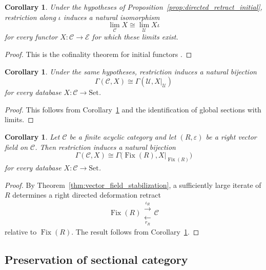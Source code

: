 \documentclass[12pt]{amsart}
\newtheorem{corollary}[teo]{Corollary}
\theoremstyle{definition}
\theoremstyle{remark}
\numberwithin{figure}{section}%
\newcommand{\CC}{\mathcal{C}}
\newcommand{\E}{\mathcal{E}}
\newcommand{\Sets}{\mathrm{Set}}
\newcommand{\Uc}{\mathcal{U}}
\begin{document}
\begin{corollary}\label{cor:directed_retract_limits}
Under the hypotheses of
Proposition~\ref{prop:directed_retract_initial}, restriction along
\(\iota\) induces a natural isomorphism
\[
\lim_\CC X
\cong
\lim_\Uc X\iota
\]
for every functor \(X\colon\CC\to\E\) for which these limits exist.
\end{corollary}

\begin{proof}
This is the cofinality theorem for initial functors \cite[Chapter~IX, Section~3]{MacLaneCategories}.
\end{proof}

\begin{corollary}\label{cor:directed_retract_database_sections}
Under the same hypotheses, restriction induces a natural bijection
\[
\Gamma(\CC,X)
\cong
\Gamma(\Uc,X|_\Uc)
\]
for every database \(X\colon\CC\to\Sets\).
\end{corollary}

\begin{proof}
This follows from
Corollary~\ref{cor:directed_retract_limits} and the identification of
global sections with limits.
\end{proof}

\begin{corollary}\label{cor:vector_field_database_sections}
Let \(\CC\) be a finite acyclic category and let
\((R,\varepsilon)\) be a right vector field on \(\CC\). Then restriction
induces a natural bijection
\[
\Gamma(\CC,X)
\cong
\Gamma\bigl(
\operatorname{Fix}(R),
X|_{\operatorname{Fix}(R)}
\bigr)
\]
for every database \(X\colon\CC\to\Sets\).
\end{corollary}

\begin{proof}
By Theorem~\ref{thm:vector_field_stabilization}, a sufficiently large
iterate of \(R\) determines a right directed deformation retract
\[
\operatorname{Fix}(R)
\mathrel{\substack{\xrightarrow{\iota_R}\\[-1mm]\xleftarrow[r_R]{}}}
\CC
\]
relative to \(\operatorname{Fix}(R)\). The result follows from
Corollary~\ref{cor:directed_retract_database_sections}.
\end{proof}

\subsection{Preservation of sectional category}
\label{subsec:sectional_category_reduction}
\end{document}
